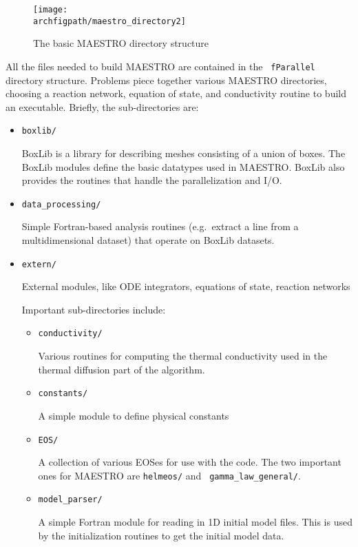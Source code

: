 \begin{figure}[t]
\centering
\texttt{[image: \\archfigpath/maestro\_directory2]}
\caption[MAESTRO directory structure]
{The basic MAESTRO directory structure}
\end{figure}

All the files needed to build MAESTRO are contained in the {\tt
  fParallel} directory structure.  Problems piece together various
MAESTRO directories, choosing a reaction network, equation of state,
and conductivity routine to build an executable.  Briefly, the
sub-directories are:
\begin{itemize}
\item {\tt boxlib/} 

 BoxLib is a library for describing meshes consisting of a union
 of boxes.  The BoxLib modules define the basic datatypes used
 in MAESTRO.  BoxLib also provides the routines that handle the
 parallelization and I/O.

\item {\tt data\_processing/}

 Simple Fortran-based analysis routines (e.g.\ extract a line from a
 multidimensional dataset) that operate on BoxLib datasets.

\item {\tt extern/}

 External modules, like ODE integrators, equations of state, reaction
 networks

 Important sub-directories include:
 \begin{itemize}
 \item {\tt conductivity/}

 Various routines for computing the thermal conductivity used in the
 thermal diffusion part of the algorithm.

 \item {\tt constants/}

 A simple module to define physical constants

 \item {\tt EOS/}

 A collection of various EOSes for use with the code.  The two
 important ones for MAESTRO are {\tt helmeos/} and {\tt
 gamma\_law\_general/}.

 \item {\tt model\_parser/}

 A simple Fortran module for reading in 1D initial model files.  This
 is used by the initialization routines to get the initial model data.


\end{itemize}
\end{itemize}
